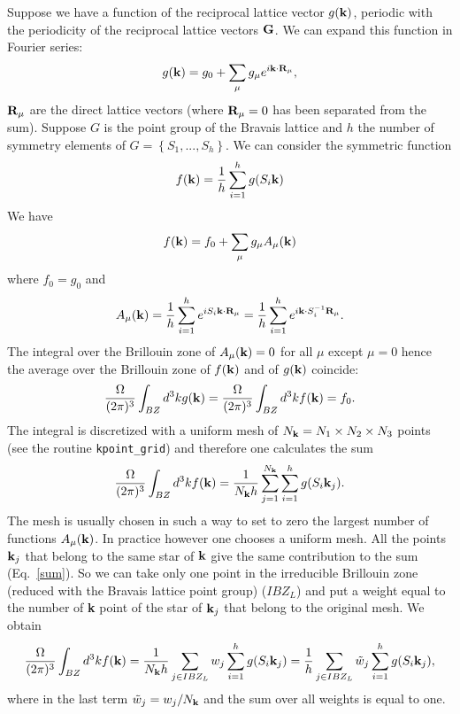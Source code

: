 \documentclass[12pt,a4paper,twoside]{report}
\begin{document}
Suppose we have a function of the reciprocal lattice vector $g({\bf k})$,
periodic with the periodicity of the reciprocal lattice vectors
${\bf G}$. We can expand this function in Fourier series:
\begin{equation}
g({\bf k})= g_0 + \sum_\mu g_\mu e^{i{\bf k}\cdot {\bf R}_\mu},
\end{equation}
${\bf R}_\mu$ are the direct lattice vectors (where ${\bf R}_\mu=0$ has 
been separated from the sum). Suppose $G$ is the point group of the Bravais
lattice and $h$ the number of symmetry elements of 
$G=\left\{S_1,...,S_h\right\}$. We can consider the symmetric
function
\begin{equation}
f({\bf k}) = {1\over h} \sum_{i=1}^h g(S_i {\bf k})
\end{equation}
We have 
\begin{equation}
f({\bf k}) = f_0 + \sum_\mu g_\mu A_\mu ({\bf k})
\end{equation}
where $f_0=g_0$ and 
\begin{equation}
A_\mu ({\bf k}) = {1\over h} \sum_{i=1}^h e^{i S_i {\bf k} \cdot {\bf R}_\mu} =
{1\over h} \sum_{i=1}^h e^{i {\bf k} \cdot S_i^{-1}{\bf R}_\mu}.
\end{equation}
The integral over the Brillouin zone of $A_\mu ({\bf k})=0$ for all $\mu$ 
except $\mu=0$ hence the average over the Brillouin zone of $f({\bf k})$ and
of $g(\bf k)$ coincide:
\begin{equation}
{\Omega \over (2\pi)^3} \int_{BZ} d^3k g({\bf k}) = {\Omega \over (2\pi)^3} \int_{BZ} d^3k f({\bf k}) = f_0.
\end{equation}
The integral is discretized with a uniform mesh of $N_{\bf k}=N_1\times N_2 
\times N_3$ points (see the routine \texttt{kpoint\_grid}) and therefore one
calculates the sum
\begin{equation}
{\Omega \over (2\pi)^3} \int_{BZ} d^3k f({\bf k}) =
{1\over N_{\bf k}h} \sum_{j=1}^{N_{\bf k}} \sum_{i=1}^h g(S_i {\bf k}_j).
\label{sum}
\end{equation}
The mesh is usually chosen in such a way to set to zero the largest number
of functions $A_{\mu}({\bf k})$. In practice however one chooses a uniform
mesh. 
All the points ${\bf k}_j$ that belong to the same star of ${\bf k}$
give the same contribution to the sum (Eq.~\ref{sum}). So we can take 
only one point
in the irreducible Brillouin zone (reduced with the Bravais lattice point
group) ($IBZ_{L}$) and put a weight equal to the number of {\bf k} point
of the star of ${\bf k}_j$ that belong to the original mesh. We obtain
\begin{equation}
{\Omega \over (2\pi)^3} \int_{BZ} d^3k f({\bf k}) =
{1\over N_{\bf k}h} \sum_{j\in IBZ_L} w_j \sum_{i=1}^h g(S_i {\bf k}_j) 
={1\over h} \sum_{j\in IBZ_L} \tilde w_j \sum_{i=1}^h g(S_i {\bf k}_j),
\end{equation}
where in the last term $\tilde w_j = w_j / N_{\bf k}$ and the sum over
all weights is equal to one.
\end{document}
